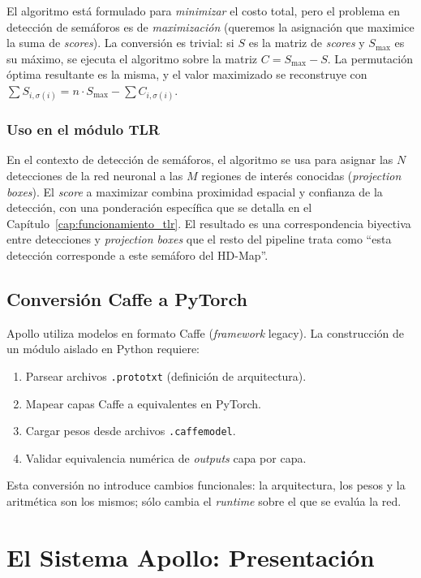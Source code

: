 El algoritmo está formulado para \textit{minimizar} el costo total, pero el problema en detección de semáforos es de \textit{maximización} (queremos la asignación que maximice la suma de \textit{scores}). La conversión es trivial: si $S$ es la matriz de \textit{scores} y $S_{\max}$ es su máximo, se ejecuta el algoritmo sobre la matriz $C = S_{\max} - S$. La permutación óptima resultante es la misma, y el valor maximizado se reconstruye con $\sum S_{i,\sigma(i)} = n\cdot S_{\max} - \sum C_{i,\sigma(i)}$.

\subsubsection{Uso en el módulo TLR}

En el contexto de detección de semáforos, el algoritmo se usa para asignar las $N$ detecciones de la red neuronal a las $M$ regiones de interés conocidas (\textit{projection boxes}). El \textit{score} a maximizar combina proximidad espacial y confianza de la detección, con una ponderación específica que se detalla en el Capítulo~\ref{cap:funcionamiento_tlr}. El resultado es una correspondencia biyectiva entre detecciones y \textit{projection boxes} que el resto del pipeline trata como ``esta detección corresponde a este semáforo del HD-Map''.

\subsection{Conversión Caffe a PyTorch}

Apollo utiliza modelos en formato Caffe (\textit{framework} legacy). La construcción de un módulo aislado en Python requiere:

\begin{enumerate}
    \item Parsear archivos \texttt{.prototxt} (definición de arquitectura).
    \item Mapear capas Caffe a equivalentes en PyTorch.
    \item Cargar pesos desde archivos \texttt{.caffemodel}.
    \item Validar equivalencia numérica de \textit{outputs} capa por capa.
\end{enumerate}

Esta conversión no introduce cambios funcionales: la arquitectura, los pesos y la aritmética son los mismos; sólo cambia el \textit{runtime} sobre el que se evalúa la red.

\section{El Sistema Apollo: Presentación}

